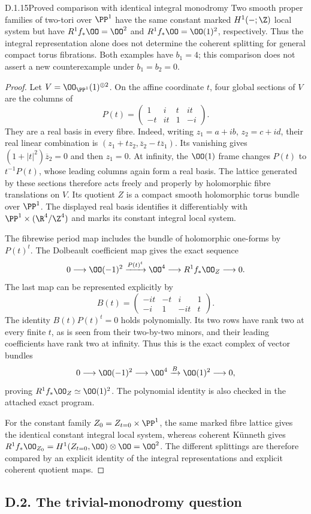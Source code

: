 \begin{idstatement}{D.1.15}{Proved comparison with identical integral monodromy}
\label{st:D.1.15}
Two smooth proper families of two-tori over $\PP^1$ have the same
constant marked $H^1(-;\Z)$ local system but have
$R^1f_*\OO=\OO^2$ and $R^1f_*\OO=\OO(1)^2$, respectively.
Thus the integral representation alone does not determine the
coherent splitting for general compact torus fibrations. Both
examples have $b_1=4$; this comparison does not assert a new
counterexample under $b_1=b_2=0$.
\end{idstatement}
\begin{proof}
Let $V=\OO_{\PP^1}(1)^{\oplus2}$. On the affine coordinate $t$,
four global sections of $V$ are the columns of
\[
P(t)=\begin{pmatrix}1&i&t&it\\-t&it&1&-i\end{pmatrix}.
\]
They are a real basis in every fibre. Indeed, writing
$z_1=a+ib$, $z_2=c+id$, their real linear combination is
$(z_1+t z_2,\overline z_2-t\overline z_1)$.
Its vanishing gives $(1+|t|^2)\overline z_2=0$ and then $z_1=0$.
At infinity, the $\OO(1)$ frame changes $P(t)$ to $t^{-1}P(t)$,
whose leading columns again form a real basis. The lattice
generated by these sections therefore acts freely and properly by
holomorphic fibre translations on $V$. Its quotient $Z$ is a
compact smooth holomorphic torus bundle over $\PP^1$.
The displayed real basis identifies it differentiably with
$\PP^1\times(\R^4/\Z^4)$ and marks its constant integral local
system.

The fibrewise period map includes the bundle of holomorphic
one-forms by $P(t)^t$. The Dolbeault coefficient map gives the
exact sequence
\[
0\longrightarrow\OO(-1)^2
 \xrightarrow{P(t)^t}\OO^4
 \longrightarrow R^1f_*\OO_Z\longrightarrow0.
\]
The last map can be represented explicitly by
\[
B(t)=\begin{pmatrix}-it&-t&i&1\\-i&1&-it&t\end{pmatrix}.
\]
The identity $B(t)P(t)^t=0$ holds polynomially. Its two rows have
rank two at every finite $t$, as is seen from their two-by-two
minors, and their leading coefficients have rank two at infinity.
Thus this is the exact complex of vector bundles
\[
0\longrightarrow\OO(-1)^2\longrightarrow\OO^4
 \xrightarrow{B}\OO(1)^2\longrightarrow0,
\]
proving $R^1f_*\OO_Z\simeq\OO(1)^2$. The polynomial identity is
also checked in the attached exact program.

For the constant family $Z_0=Z_{t=0}\times\PP^1$, the same
marked fibre lattice gives the identical constant integral local
system, whereas coherent K\"unneth gives
$R^1f_*\OO_{Z_0}=H^1(Z_{t=0},\OO)\otimes\OO=\OO^2$.
The different splittings are therefore compared by an explicit
identity of the integral representations and explicit coherent
quotient maps.
\end{proof}


\subsection{D.2. The trivial-monodromy question}



